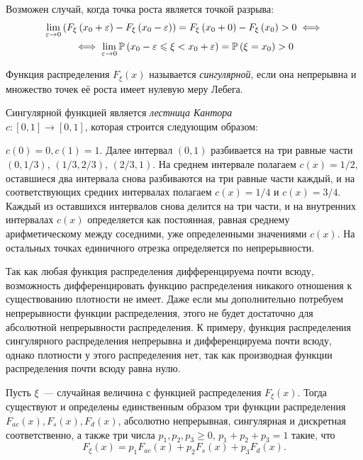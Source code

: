 \begin{rmrk}
    Возможен случай, когда точка роста является точкой разрыва:
    \begin{multline*}
    \lim _{\varepsilon \to 0} \left( F_{\xi}\left(x_{0}+\varepsilon\right) - F_{\xi}\left(x_{0}-\varepsilon\right) \right)=F_{\xi}\left(x_{0}+0\right)-F_{\xi}\left(x_{0}\right)>0 \iff \\
    \iff \lim\limits_{\varepsilon \to 0}\operatorname{\mathbb{P}}\left(x_{0}-\varepsilon \leqslant \xi<x_{0}+\varepsilon\right)=\operatorname{\mathbb{P}}\left(\xi=x_{0}\right)>0
    \end{multline*}
\end{rmrk}

\begin{defn}
    Функция распределения $F_\xi(x)$ называется \textit{сингулярной}, если она непрерывна и множество точек её роста имеет нулевую меру Лебега.
\end{defn}
\begin{exmp}
    Сингулярной функцией является \textit{лестница Кантора} \\ $c \colon [0, 1] \to [0, 1]$, которая строится следующим образом:
    
    $c(0) = 0, c(1) = 1$. 
    Далее интервал $(0, 1)$ разбивается на три равные части $(0, 1/3)$, $(1/3, 2/3)$, $(2/3, 1)$. 
    На среднем интервале полагаем $c(x) = 1/2$, оставшиеся два интервала снова разбиваются на три равные части каждый, и на соответствующих средних интервалах полагаем $c(x) = 1/4$ и $c(x) = 3/4$. 
    Каждый из оставшихся интервалов снова делится на три части, и на внутренних интервалах $c(x)$ определяется как постоянная, равная среднему арифметическому между соседними, уже определенными значениями $c(x)$. 
    На остальных точках единичного отрезка определяется по непрерывности. 
\end{exmp}

\begin{rmrk}
    Так как любая функция распределения дифференцируема почти всюду, возможность дифференцировать функцию распределения никакого отношения к существованию плотности не имеет. 
    Даже если мы дополнительно потребуем непрерывности функции распределения, этого не будет достаточно для абсолютной непрерывности распределения. 
    К примеру, функция распределения сингулярного распределения непрерывна и дифференцируема почти всюду, однако плотности у этого распределения нет, так как производная функции распределения почти всюду равна нулю.
\end{rmrk}

\begin{namedthm}
    Пусть $\xi$~--- случайная величина с функцией распределения $F_\xi(x).$ 
    Тогда существуют и определены единственным образом три функции распределения $F_{ac}(x), F_s(x), F_d(x)$, 
    абсолютно непрерывная, сингулярная и дискретная соответственно, а также три числа $p_1, p_2, p_3 \geqslant 0,\, p_1 + p_2 + p_3 = 1$ такие, что 
    \begin{equation*}
        F_{\xi}(x)=p_{1} F_{ac}(x)+p_{2} F_{s}(x)+p_{3} F_{d}(x).
    \end{equation*}
\end{namedthm}
